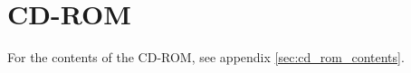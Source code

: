 
\cleardoublepage
\section*{CD-ROM}
\label{sec:cd_rom}

For the contents of the CD-ROM, see appendix \ref{sec:cd_rom_contents}.
